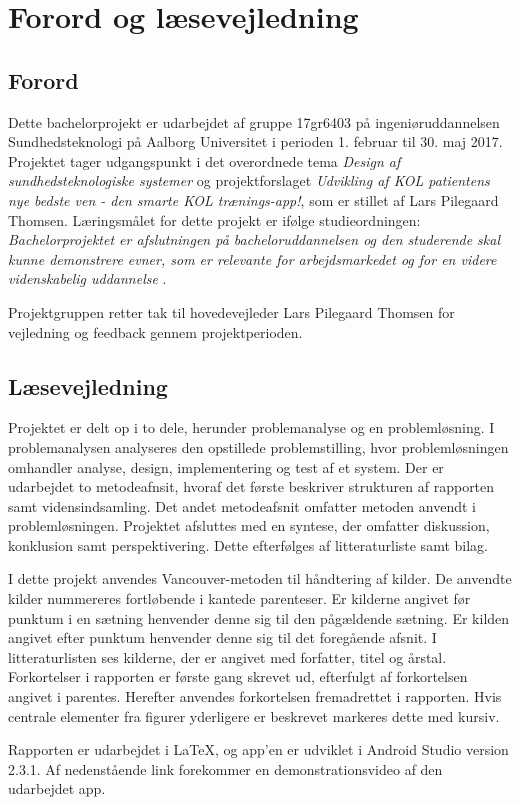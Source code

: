 \chapter*{Forord og læsevejledning}

\section*{Forord}
Dette bachelorprojekt er udarbejdet af gruppe 17gr6403 på ingeniøruddannelsen Sundhedsteknologi på Aalborg Universitet i perioden 1. februar til 30. maj 2017. Projektet tager udgangspunkt i det overordnede tema \textit{Design af sundhedsteknologiske systemer} og projektforslaget \textit{Udvikling af KOL patientens nye bedste ven - den smarte KOL trænings-app!}, som er stillet af Lars Pilegaard Thomsen. 
Læringsmålet for dette projekt er ifølge studieordningen: \textit{Bachelorprojektet er afslutningen på bacheloruddannelsen og den studerende skal kunne demonstrere evner, som er relevante for arbejdsmarkedet og for en videre videnskabelig uddannelse} \cite{Studieordning2014}.

Projektgruppen retter tak til hovedevejleder Lars Pilegaard Thomsen for vejledning og feedback gennem projektperioden.

\section*{Læsevejledning}
Projektet er delt op i to dele, herunder problemanalyse og en problemløsning. I problemanalysen analyseres den opstillede problemstilling, hvor problemløsningen omhandler analyse, design, implementering og test af et system. Der er udarbejdet to metodeafnsit, hvoraf det første beskriver strukturen af rapporten samt vidensindsamling. Det andet metodeafsnit omfatter metoden anvendt i problemløsningen. Projektet afsluttes med en syntese, der omfatter diskussion, konklusion samt perspektivering. Dette efterfølges af litteraturliste samt bilag. 

I dette projekt anvendes Vancouver-metoden til håndtering af kilder. De anvendte kilder nummereres fortløbende i kantede parenteser. Er kilderne angivet før punktum i en sætning henvender denne sig til den pågældende sætning. Er kilden angivet efter punktum henvender denne sig til det foregående afsnit. I litteraturlisten ses kilderne, der er angivet med forfatter, titel og årstal. Forkortelser i rapporten er første gang skrevet ud, efterfulgt af forkortelsen angivet i parentes. Herefter anvendes forkortelsen fremadrettet i rapporten. Hvis centrale elementer fra figurer yderligere er beskrevet markeres dette med kursiv. 

Rapporten er udarbejdet i \LaTeX, og app'en er udviklet i Android Studio version 2.3.1.
Af nedenstående link forekommer en demonstrationsvideo af den udarbejdet app. 